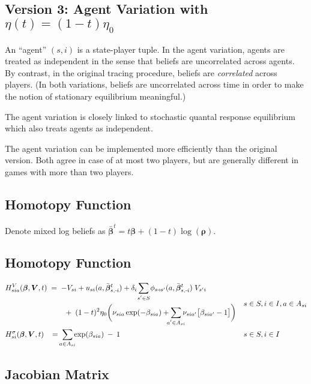 \documentclass[11pt,fleqn]{article}
\newcommand{\bbeta}{\bm{\beta}}
\newcommand{\brho}{\bm{\rho}}
\newcommand{\bV}{\bm{V}}
\newcommand{\shortminus}{{\text{\scalebox{0.4}[1.0]{\(-\)}}}}
\newcommand{\minusi}{\shortminus i}
\newcommand{\shortrightarrow}{\parbox{4pt}{\tikz{\draw[->](0,0)--(4pt,0);}}}
\newcommand{\phiss}{\phi_{s\shortrightarrow s'}}
\begin{document}
\subsection{Version 3: Agent Variation with $\eta(t) = (1-t)\eta_0$}

An ``agent'' $(s,i)$ is a state-player tuple. In the agent variation, agents are treated as independent in the sense that beliefs are uncorrelated across agents. By contrast, in the original tracing procedure, beliefs are \emph{correlated} across players. (In both variations, beliefs are uncorrelated across time in order to make the notion of stationary equilibrium meaningful.)

The agent variation is closely linked to stochastic quantal response equilibrium which also treats agents as independent.

The agent variation can be implemented more efficiently than the original version. Both agree in case of at most two players, but are generally different in games with more than two players.


\subsection*{Homotopy Function}

Denote mixed log beliefs as $\bar{\bbeta}^t = t\bbeta + (1-t)\log(\brho)$.

\subsection*{Homotopy Function}

\begin{align*}
	& \begin{aligned}
		H^V_{sia}(\bbeta,\bV,t) & \;=\; - V_{si} + u_{si}(a,\bar{\bbeta}^t_{s,\minusi}) + \delta_i \sum\limits_{\mathclap{s'\in S}} \phiss(a,\bar{\bbeta}^t_{s,\minusi}) \; V_{s'i} \\
		& \qquad \;+\; (1-t)^2\eta_0 \biggl( \nu_{sia} \exp(-\beta_{sia}) + \sum\limits_{\mathclap{a'\in A_{si}}} \nu_{sia'} \bigl[ \beta_{sia'} - 1 \bigr] \biggr)
	\end{aligned} && s\in S, i\in I, a\in A_{si} \\
	& H^\sigma_{si}(\bbeta,\bV,t) \;\; \;=\; \sum\limits_{\mathclap{a\in A_{si}}} \exp(\beta_{sia}) \:-\: 1 && s\in S, i\in I
\end{align*}


\subsection*{Jacobian Matrix}
\end{document}
